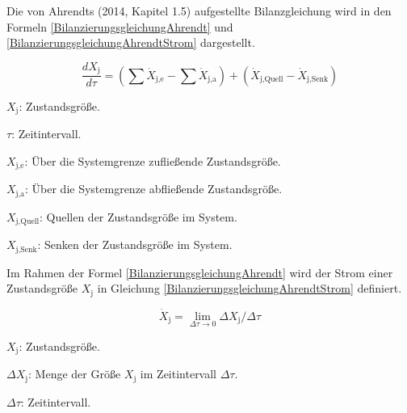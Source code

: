 Die von Ahrendts (2014, Kapitel 1.5) aufgestellte Bilanzgleichung wird in den Formeln \eqref{BilanzierungsgleichungAhrendt} und 
\eqref{BilanzierungsgleichungAhrendtStrom} dargestellt.

\begin{equation}
    \frac{dX_{\text{j}}}{d\tau} = (\sum \dot{X}_{\text{j,e}} - \sum \dot{X}_{\text{j,a}}) + (\dot{X}_{\text{j,Quell}} - \dot{X}_{\text{j,Senk}})
    \label{BilanzierungsgleichungAhrendt}
\end{equation}

\begin{description}
    \item \(X_{\text{j}}\): Zustandsgröße.
    \item \(\tau\): Zeitintervall.
    \item \(X_{\text{j,e}}\): Über die Systemgrenze zufließende Zustandsgröße.
    \item \(X_{\text{j,a}}\): Über die Systemgrenze abfließende Zustandsgröße.
    \item \(X_{\text{j,Quell}}\): Quellen der Zustandsgröße im System.
    \item \(X_{\text{j,Senk}}\): Senken der Zustandsgröße im System.
\end{description}

Im Rahmen der Formel \eqref{BilanzierungsgleichungAhrendt} wird der Strom einer Zustandsgröße \(X_{\text{j}}\) in Gleichung 
\eqref{BilanzierungsgleichungAhrendtStrom} definiert.

\begin{equation}
    \dot{X}_{\text{j}} = \lim_{\Delta\tau \to 0} \Delta X_{\text{j}}/ \Delta\tau
    \label{BilanzierungsgleichungAhrendtStrom}
\end{equation}

\begin{description}
    \item \(X_{\text{j}}\): Zustandsgröße.
    \item \(\Delta X_{\text{j}}\): Menge der Größe \(X_{\text{j}}\) im Zeitintervall \(\Delta \tau\).
    \item \(\Delta \tau\): Zeitintervall.
\end{description}

